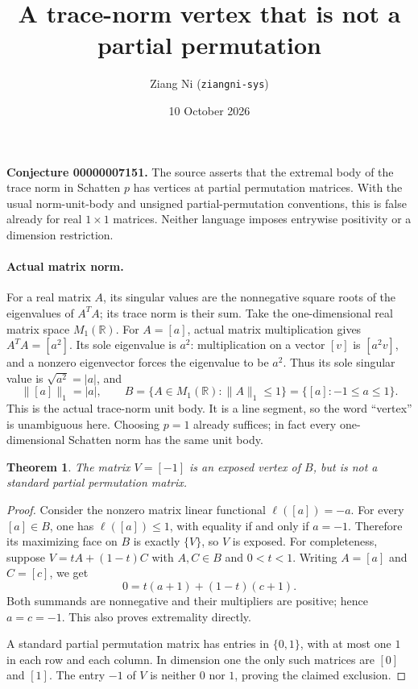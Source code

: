 \documentclass[11pt]{article}
\title{A trace-norm vertex that is not a partial permutation}
\author{Ziang Ni (\texttt{ziangni-sys})}
\date{10 October 2026}
\newtheorem{theorem}{Theorem}
\begin{document}
\maketitle
\noindent\textbf{Conjecture 00000007151.}
The source asserts that the extremal body of the trace norm in
Schatten $p$ has vertices at partial permutation matrices.
With the usual norm-unit-body and unsigned partial-permutation
conventions, this is false already for real $1\times1$ matrices.
Neither language imposes entrywise positivity or a dimension restriction.

\paragraph{Actual matrix norm.}
For a real matrix $A$, its singular values are the nonnegative square
roots of the eigenvalues of $A^T A$; its trace norm is their sum.
Take the one-dimensional real matrix space $M_1(\mathbb R)$.
For $A=[a]$, actual matrix multiplication gives $A^TA=[a^2]$.
Its sole eigenvalue is $a^2$: multiplication on a vector $[v]$ is
$[a^2v]$, and a nonzero eigenvector forces the eigenvalue to be $a^2$.
Thus its sole singular value is $\sqrt{a^2}=|a|$, and
\[
 \|[a]\|_1=|a|,\qquad
 B=\{A\in M_1(\mathbb R):\|A\|_1\le1\}
   =\{[a]:-1\le a\le1\}.
\]
This is the actual trace-norm unit body. It is a line segment,
so the word ``vertex'' is unambiguous here. Choosing $p=1$ already
suffices; in fact every one-dimensional Schatten norm has the same
unit body.

\begin{theorem}
The matrix $V=[-1]$ is an exposed vertex of $B$, but is not a standard
partial permutation matrix.
\end{theorem}
\begin{proof}
Consider the nonzero matrix linear functional $\ell([a])=-a$.
For every $[a]\in B$, one has $\ell([a])\le1$, with equality
if and only if $a=-1$. Therefore its maximizing face on $B$ is
exactly $\{V\}$, so $V$ is exposed.
For completeness, suppose $V=tA+(1-t)C$ with $A,C\in B$ and
$0<t<1$. Writing $A=[a]$ and $C=[c]$, we get
\[
 0=t(a+1)+(1-t)(c+1).
\]
Both summands are nonnegative and their multipliers are positive;
hence $a=c=-1$. This also proves extremality directly.

A standard partial permutation matrix has entries in $\{0,1\}$,
with at most one $1$ in each row and each column. In dimension one
the only such matrices are $[0]$ and $[1]$. The entry $-1$ of $V$
is neither $0$ nor $1$, proving the claimed exclusion.
\end{proof}
\end{document}
